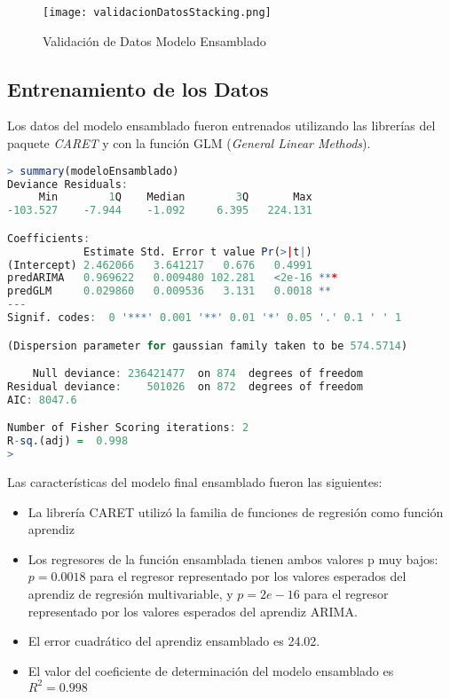 \begin{figure}[H]
    \centering
    \texttt{[image: validacionDatosStacking.png]}
    \caption{Validación de Datos Modelo Ensamblado}
\end{figure}

\subsection{Entrenamiento de los Datos}
Los datos del modelo ensamblado fueron entrenados utilizando las librerías del paquete \emph{CARET} y con la función GLM (\emph{General Linear Methods}).

\begin{lstlisting}[language=R]
> summary(modeloEnsamblado)
Deviance Residuals:
     Min        1Q    Median        3Q       Max
-103.527    -7.944    -1.092     6.395   224.131

Coefficients:
            Estimate Std. Error t value Pr(>|t|)
(Intercept) 2.462066   3.641217   0.676   0.4991
predARIMA   0.969622   0.009480 102.281   <2e-16 ***
predGLM     0.029860   0.009536   3.131   0.0018 **
---
Signif. codes:  0 '***' 0.001 '**' 0.01 '*' 0.05 '.' 0.1 ' ' 1

(Dispersion parameter for gaussian family taken to be 574.5714)

    Null deviance: 236421477  on 874  degrees of freedom
Residual deviance:    501026  on 872  degrees of freedom
AIC: 8047.6

Number of Fisher Scoring iterations: 2
R-sq.(adj) =  0.998
>
\end{lstlisting}

Las características del modelo final ensamblado fueron las siguientes:

\begin{itemize}
  \item La librería CARET utilizó la familia de funciones de regresión como función aprendiz
  \item Los regresores de la función ensamblada tienen ambos valores p muy bajos: $p = 0.0018$ para el regresor representado por los valores esperados del aprendiz de regresión multivariable, y $p = 2e-16$ para el regresor representado por los valores esperados del aprendiz ARIMA.
  \item El error cuadrático del aprendiz ensamblado es 24.02.
  \item El valor del coeficiente de determinación del modelo ensamblado es $R^2 = 0.998$
\end{itemize}

